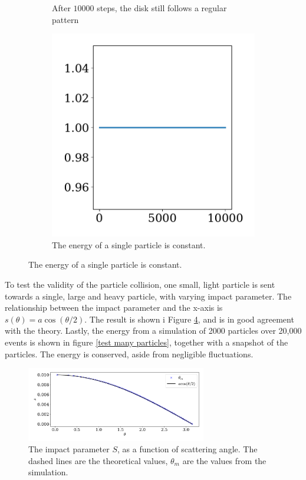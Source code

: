 \documentclass{article}
\begin{document}
\begin{figure}
\begin{subfigure}{.35\textwidth}
                \caption{After $10 000$ steps, the disk still follows a regular pattern}
                \label{single particle}
            \end{subfigure}
            \begin{subfigure}{.65\textwidth}
                \includegraphics[width=.8\textwidth]{../plots/test_case_one_particle/energy.pdf}
                \caption{The energy of a single particle is constant.}
                \label{single particle energy}
            \end{subfigure}
        \end{figure}
        
        To test the validity of the particle collision, one small, light particle is sent towards a single, large and heavy particle, with varying impact parameter. The relationship between the impact parameter and the x-axis is $s(\theta) = a \cos(\theta / 2)$.\cite{klasmek} The result is shown i Figure \ref{scattering}, and is in good agreement with the theory. Lastly, the energy from a simulation of 2000 particles over 20,000 events is shown in figure \ref{test many particles}, together with a snapshot of the particles. The energy is conserved, aside from negligible fluctuations.

        \begin{figure}
            \centering
            \hspace{-10mm}
            \includegraphics[width=0.7\textwidth]{../plots/test_case_collision_angle/collision_angle.pdf}
            \caption{The impact parameter $S$, as a function of scattering angle. The dashed lines are the theoretical values, $\theta_m$ are the values from the simulation.}
            \label{scattering}
        \end{figure}
\end{document}

